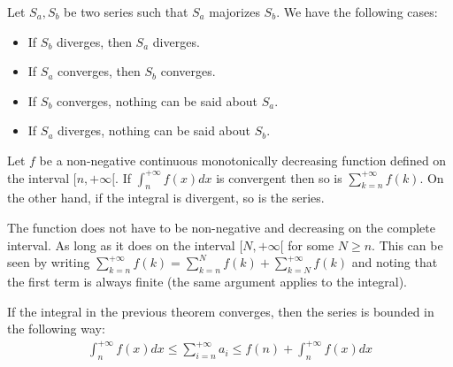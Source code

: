     \begin{method}
        Let $S_a, S_b$ be two series such that $S_a$ majorizes $S_b$. We have the following cases:
        \begin{itemize}
            \item If $S_b$ diverges, then $S_a$ diverges.
            \item If $S_a$ converges, then $S_b$ converges.
            \item If $S_b$ converges, nothing can be said about $S_a$.
            \item If $S_a$ diverges, nothing can be said about $S_b$.
        \end{itemize}
    \end{method}

    \begin{method}
        Let $f$ be a non-negative continuous monotonically decreasing function defined on the interval $[n,+\infty[$. If $\int_n^{+\infty}f(x)dx$ is convergent then so is $\sum_{k=n}^{+\infty}f(k)$. On the other hand, if the integral is divergent, so is the series.
    \end{method}
    \begin{remark}
        The function does not have to be non-negative and decreasing on the complete interval. As long as it does on the interval $[N,+\infty[$ for some $N\geq n$. This can be seen by writing $\sum_{k=n}^{+\infty}f(k) = \sum_{k=n}^Nf(k) + \sum_{k=N}^{+\infty}f(k)$ and noting that the first term is always finite (the same argument applies to the integral).
    \end{remark}

    \begin{property}
        If the integral in the previous theorem converges, then the series is bounded in the following way:
        \begin{gather}
            \int_n^{+\infty}f(x)dx \leq \sum_{i=n}^{+\infty}a_i \leq f(n) + \int_n^{+\infty}f(x)dx
        \end{gather}
    \end{property}

